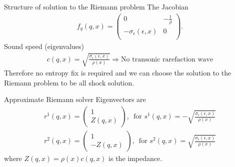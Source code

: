 \documentclass{beamer}
\begin{document}
\begin{frame}{Structure of solution to the Riemann problem}
The Jacobian
\begin{align*}
f_q(q,x)=\left(
                     \begin{array}{cc}
                       0  &  -\frac{1}{\rho}\\
                       -\sigma_{\epsilon}(\epsilon,x) &  0 \\
                     \end{array}
                   \right).
\end{align*}
Sound speed (eigenvalues)
\begin{align*}
c(q,x)=\sqrt{\frac{\sigma_{\epsilon}(\epsilon,x)}{\rho(x)}}  \Longrightarrow \mbox{No transonic rarefaction wave}
\label{sounds}
\end{align*}
Therefore no entropy fix is required and we can choose the solution to the Riemann problem to be all shock solution.
\end{frame}

\begin{frame}{Approximate Riemann solver}
Eigenvectors are
\begin{align*}
r^1(q,x)=\left(
                     \begin{array}{c}
                       1 \\
                       Z(q,x)
                     \end{array}
                   \right)  ,\,\,\, \mbox{for } s^1(q,x)=-\sqrt{\frac{\sigma_{\epsilon}(\epsilon,x)}{\rho(x)}}
\end{align*}
\begin{align*}
r^2(q,x)=\left(
                     \begin{array}{c}
                       1 \\
                       -Z(q,x)
                     \end{array}
                   \right)  ,\,\,\, \mbox{for } s^2(q,x)=\sqrt{\frac{\sigma_{\epsilon}(\epsilon,x)}{\rho(x)}}
\end{align*}
where $Z(q,x)=\rho(x)c(q,x)$ is the impedance.
\end{frame}
\end{document}
